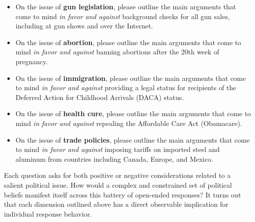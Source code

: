 \begin{itemize}
	\item On the issue of \textbf{gun legislation}, please outline the main arguments that come to mind \textit{in favor and against} background checks for all gun sales, including at gun shows and over the Internet.
	\item On the issue of \textbf{abortion}, please outline the main arguments that come to mind \textit{in favor and against} banning abortions after the 20th week of pregnancy.
	\item On the issue of \textbf{immigration}, please outline the main arguments that come to mind \textit{in favor and against} providing a legal status for recipients of the Deferred Action for Childhood Arrivals (DACA) status.
	\item On the issue of \textbf{health cure}, please outline the main arguments that come to mind \textit{in favor and against} repealing the Affordable Care Act (Obamacare).
	\item On the issue of \textbf{trade policies}, please outline the main arguments that come to mind \textit{in favor and against} imposing tariffs on imported steel and aluminum from countries including Canada, Europe, and Mexico.
\end{itemize}

Each question asks for both positive or negative considerations related to a salient political issue. How would a complex and constrained set of political beliefs manifest itself across this battery of open-ended responses? It turns out that each dimension outlined above has a direct observable implication for individual response behavior.

